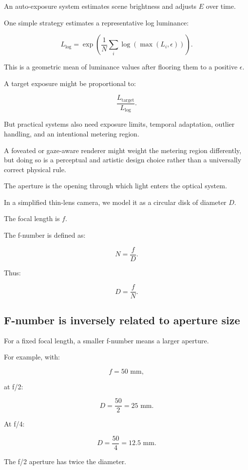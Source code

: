 An auto-exposure system estimates scene brightness and adjusts \(E\) over time.

One simple strategy estimates a representative log luminance:

\[ \boxed{ L_{\log} = \exp\left( \frac1N\sum_i\log(\max(L_i,\epsilon)) \right). } \]

This is a geometric mean of luminance values after flooring them to a positive \(\epsilon\).

A target exposure might be proportional to:

\[ \frac{L_{\mathrm{target}}}{L_{\log}}. \]

But practical systems also need exposure limits, temporal adaptation, outlier handling, and an intentional metering region.

A foveated or gaze-aware renderer might weight the metering region differently, but doing so is a perceptual and artistic design choice rather than a universally correct physical rule.

The aperture is the opening through which light enters the optical system.

In a simplified thin-lens camera, we model it as a circular disk of diameter \(D\).

The focal length is \(f\).

The f-number is defined as:

\[ \boxed{ N=\frac fD. } \]

Thus:

\[ \boxed{ D=\frac fN. } \]

\subsection{F-number is inversely related to aperture size}\label{02-foundations-ii-ch036-f-number-is-inversely-related-to-aperture-size}

\hypertarget{02-foundations-ii-ch036-f-number-is-inversely-related-to-aperture-size}{}

For a fixed focal length, a smaller f-number means a larger aperture.

For example, with:

\[ f=50\text{ mm}, \]

at f/2:

\[ D=\frac{50}{2}=\boxed{25\text{ mm}}. \]

At f/4:

\[ D=\frac{50}{4}=\boxed{12.5\text{ mm}}. \]

The f/2 aperture has twice the diameter.

